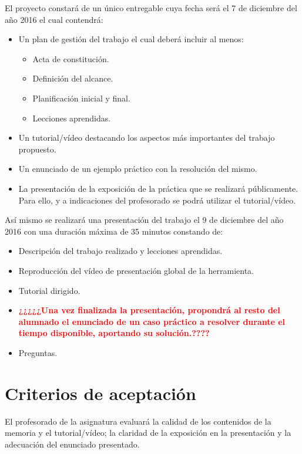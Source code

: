 \documentclass[a4paper,10pt]{scrartcl}
\begin{document}
El proyecto constará de un único entregable cuya fecha será el 7 de diciembre del año 2016 el cual contendrá:
	\begin{itemize}
		\item Un plan de gestión del trabajo el cual deberá incluir al menos:
		
		\begin{itemize}
			\item Acta de constitución.
			\item Definición del alcance.
			\item Planificación inicial y final.
			\item Lecciones aprendidas.
		\end{itemize}
		
		\item Un tutorial/vídeo destacando los aspectos más importantes del trabajo propuesto.
		
		\item Un enunciado de un ejemplo práctico con la resolución del mismo.
		
		\item La presentación de la exposición de la práctica que se realizará públicamente. Para ello, y a indicaciones del profesorado se podrá utilizar el tutorial/vídeo.		
	\end{itemize}

Así mismo se realizará una presentación del trabajo el 9 de diciembre del año 2016 con una duración máxima de 35 minutos constando de:
\begin{itemize}
	\item Descripción del trabajo realizado y lecciones aprendidas.
	
	\item Reproducción del vídeo de presentación global de la herramienta.
	
	\item Tutorial dirigido.
	
	\item \textbf{\textcolor{red}{¿¿¿¿¿Una vez finalizada la presentación, propondrá al resto del alumnado el enunciado de un caso práctico a resolver durante el tiempo disponible, aportando su solución.????}}
	
	\item Preguntas.


\end{itemize}

\section{Criterios de aceptación}
El profesorado de la asignatura evaluará la calidad de los contenidos de la memoria y el tutorial/vídeo; la claridad de la exposición en la presentación y la adecuación del enunciado presentado.
\end{document}
